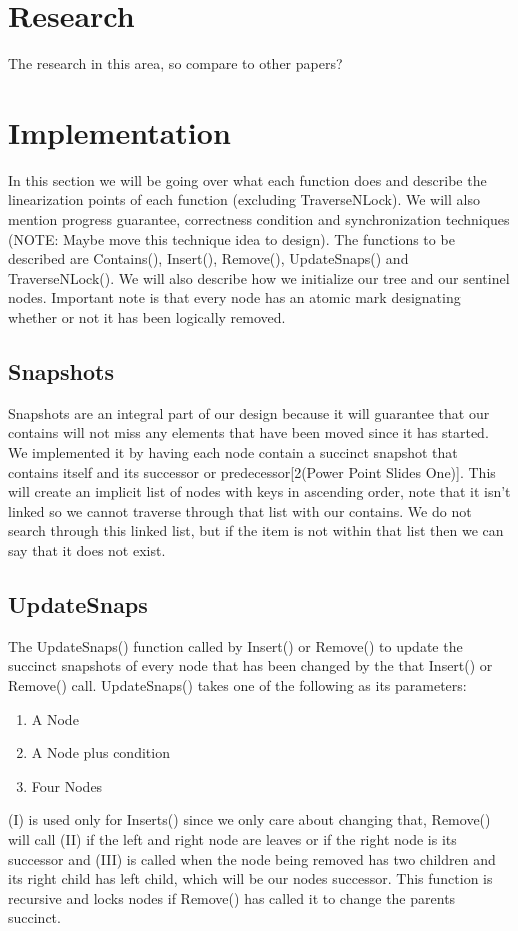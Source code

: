 \documentclass[conference]{IEEEtran}
\begin{document}
\section{Research}

The research in this area, so compare to other papers?

\section{Implementation}
In this section we will be going over what each function does and describe the linearization points of each function (excluding TraverseNLock). We will also mention progress guarantee, correctness condition and synchronization techniques (NOTE: Maybe move this technique idea to design). The functions to be described are Contains(), Insert(), Remove(), UpdateSnaps() and TraverseNLock(). We will also describe how we initialize our tree and our sentinel nodes. Important note is that every node has an atomic mark designating whether or not it has been logically removed.
\subsection{Snapshots}
Snapshots are an integral part of our design because it will guarantee that our contains will not miss any elements that have been moved since it has started. We implemented it by having each node contain a succinct snapshot that contains itself and its successor or predecessor[2(Power Point Slides One)]. This will create an implicit list of nodes with keys in ascending order, note that it isn't linked so we cannot traverse through that list with our contains. We do not search through this linked list, but if the item is not within that list then we can say that it does not exist.
\subsection{UpdateSnaps}
The UpdateSnaps() function called by Insert() or Remove() to update the succinct snapshots of every node that has been changed by the that Insert() or Remove() call. UpdateSnaps() takes one of the following as its parameters:
\begin{enumerate}[label=(\roman*)]
	\item A Node
	\item A Node plus condition
	\item Four Nodes
\end{enumerate}
(I) is used only for Inserts() since we only care about changing that, Remove() will call (II) if the left and right node are leaves or if the right node is its successor and (III) is called when the node being removed has two children and its right child has left child, which will be our nodes successor. This function is recursive and locks nodes if Remove() has called it to change the parents succinct. 
\end{document}

